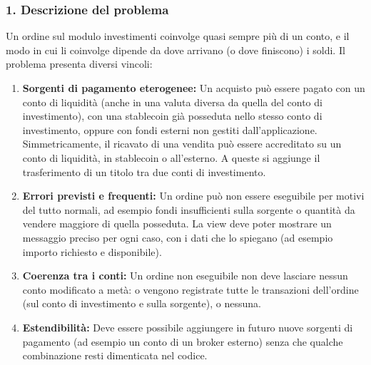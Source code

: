 \documentclass[11pt,a4paper,openright]{report}
\begin{document}
\subsubsection*{1. Descrizione del problema}
Un ordine sul modulo investimenti coinvolge quasi sempre più di un conto, e il modo in cui li coinvolge dipende da dove arrivano (o dove finiscono) i soldi. Il problema presenta diversi vincoli:
\begin{enumerate}
    \item \textbf{Sorgenti di pagamento eterogenee:} Un acquisto può essere pagato con un conto di liquidità (anche in una valuta diversa da quella del conto di investimento), con una stablecoin già posseduta nello stesso conto di investimento, oppure con fondi esterni non gestiti dall'applicazione. Simmetricamente, il ricavato di una vendita può essere accreditato su un conto di liquidità, in stablecoin o all'esterno. A queste si aggiunge il trasferimento di un titolo tra due conti di investimento.
    \item \textbf{Errori previsti e frequenti:} Un ordine può non essere eseguibile per motivi del tutto normali, ad esempio fondi insufficienti sulla sorgente o quantità da vendere maggiore di quella posseduta. La view deve poter mostrare un messaggio preciso per ogni caso, con i dati che lo spiegano (ad esempio importo richiesto e disponibile).
    \item \textbf{Coerenza tra i conti:} Un ordine non eseguibile non deve lasciare nessun conto modificato a metà: o vengono registrate tutte le transazioni dell'ordine (sul conto di investimento e sulla sorgente), o nessuna.
    \item \textbf{Estendibilità:} Deve essere possibile aggiungere in futuro nuove sorgenti di pagamento (ad esempio un conto di un broker esterno) senza che qualche combinazione resti dimenticata nel codice.
\end{enumerate}
\end{document}
